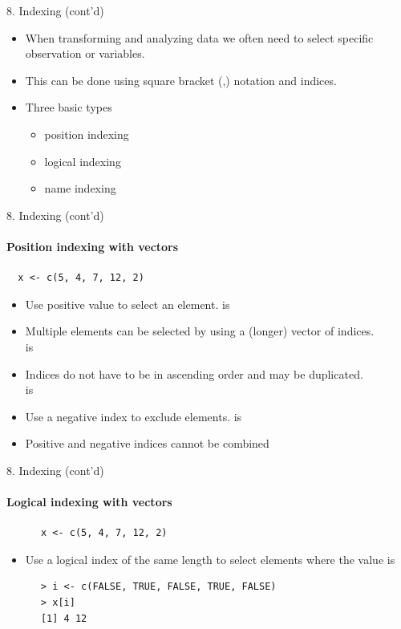 \documentclass[14pt, aspectratio=169, sectionpage=simple, xclolor=table]{beamer}
\begin{document}
\begin{frame}{8. Indexing (cont'd)}
\begin{itemize}
\item When transforming and analyzing data we often need to select specific observation or variables. 
\item This can be done using square bracket (\code{[},\code{]}) notation and \alert{indices}.
\nl
\item Three basic types
\begin{itemize}
	\item position indexing
	\item logical indexing
	\item name indexing
\end{itemize}
\end{itemize}
\end{frame}

\begin{frame}[fragile]{8. Indexing (cont'd)}
\framesubtitle{Position indexing with vectors}
\vspace*{-0.6ex}
{\small
\begin{verbatim}
  x <- c(5, 4, 7, 12, 2)	
\end{verbatim}
\vspace*{-0.3ex}	
\begin{itemize}
	\item Use \alert{positive value} to select an element.  is 
	\item Multiple elements can be selected by using a (longer) vector of indices.\\  is 
	\item Indices do not have to be in ascending order and may be duplicated.\\  is  
	\item Use a \alert{negative index} to exclude elements.  is 
	\item Positive and negative indices cannot be combined
\end{itemize}
}
\end{frame}

\begin{frame}[fragile]{8. Indexing (cont'd)}
\framesubtitle{Logical indexing with vectors}
\vspace*{-0.6ex}
{\small
	\begin{verbatim}
	  x <- c(5, 4, 7, 12, 2)	
	\end{verbatim}
}
	\vspace*{-0.3ex}	
	\begin{itemize}
		\item Use a logical index of the same length to select elements where the value is 
	\end{itemize}
	\vspace*{-0.3ex}
\small{	
	\begin{verbatim}
      > i <- c(FALSE, TRUE, FALSE, TRUE, FALSE)
      > x[i]
      [1] 4 12	
    \end{verbatim}
}
\end{frame}
\end{document}
